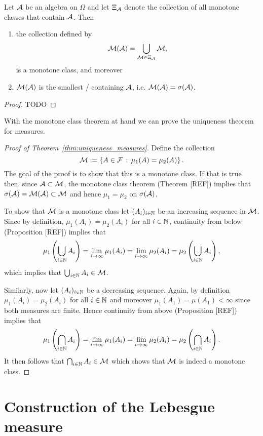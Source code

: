 \begin{theorem}
Let $\mathcal A$ be an algebra on $\Omega$ and let $\Xi_{\mathcal A}$ denote the collection of all monotone classes that contain $\mathcal A$. Then 
\begin{enumerate}
\item the collection defined by
\[
	\mathcal M(\mathcal A) = \bigcup_{\mathcal M \in \Xi_{\mathcal A}} \mathcal M,
\]
is a monotone class, and moreover
\item $\mathcal M(\mathcal A)$ is the smallest \sigalg/ containing $\mathcal A$, i.e. $\mathcal M(\mathcal A) = \sigma(\mathcal A)$.
\end{enumerate}
\end{theorem}

\begin{proof}
TODO
\end{proof}

With the monotone class theorem at hand we can prove the uniqueness theorem for measures.

\begin{proof}[Proof of Theorem~\ref{thm:uniqueness_measures}]
Define the collection
\[
	\mathcal M := \left\{A \in \mathcal F \, : \, \mu_1(A) = \mu_2(A)\right\}.
\]
The goal of the proof is to show that this is a monotone class. If that is true then, since $\mathcal A \subset \mathcal M$, the monotone class theorem (Theorem [REF]) implies that $\sigma(\mathcal A) = \mathcal M(\mathcal A) \subset \mathcal M$ and hence $\mu_1 = \mu_2$ on $\sigma(\mathcal A)$.

To show that $\mathcal M$ is a monotone class let $(A_i)_{i \in \mathbb N}$ be an increasing sequence in $\mathcal M$. Since by definition, $\mu_1(A_i) = \mu_2(A_i)$ for all $i \in \mathbb N$, continuity from below (Proposition [REF]) implies that
\[
	\mu_1\left(\bigcup_{i \in \mathbb N} A_i\right) = \lim_{i \to \infty} \mu_1(A_i) 
	= \lim_{i \to \infty} \mu_2(A_i) = \mu_2\left(\bigcup_{i \in \mathbb N} A_i\right),
\]
which implies that $\bigcup_{i \in \mathbb N} A_i \in \mathcal M$.

Similarly, now let $(A_i)_{i \in \mathbb N}$ be a decreasing sequence. Again, by definition $\mu_1(A_i) = \mu_2(A_i)$ for all $i \in \mathbb N$ and moreover $\mu_1(A_1) = \mu(A_1) < \infty$ since both measures are finite. Hence continuity from above (Proposition [REF]) implies that
\[
	\mu_1\left(\bigcap_{i \in \mathbb N} A_i\right) = \lim_{i \to \infty} \mu_1(A_i) 
	= \lim_{i \to \infty} \mu_2(A_i) = \mu_2\left(\bigcap_{i \in \mathbb N} A_i\right).
\]
It then follows that $\bigcap_{i \in \mathbb N} A_i \in \mathcal M$ which shows that $\mathcal M$ is indeed a monotone class.
\end{proof}

\section{Construction of the Lebesgue measure}   

